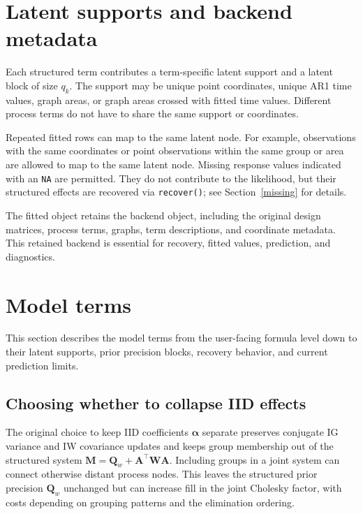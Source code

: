 \documentclass[11pt]{article}
\newcommand{\balpha}{\bm{\alpha}}
\newcommand{\bA}{\bm{A}}
\newcommand{\bM}{\bm{M}}
\newcommand{\bQ}{\bm{Q}}
\newcommand{\bW}{\bm{W}}
\newcommand{\trans}{^\top}
\begin{document}
\section{Latent supports and backend metadata}

Each structured term contributes a term-specific latent support and a latent block of size $q_k$. The support may be unique point coordinates, unique AR1 time values, graph areas, or graph areas crossed with fitted time values. Different process terms do not have to share the same support or coordinates.

Repeated fitted rows can map to the same latent node. For example, observations with the same coordinates or point observations within the same group or area are allowed to map to the same latent node. Missing response values indicated with an \texttt{NA} are permitted. They do not contribute to the likelihood, but their structured effects are recovered via \texttt{recover()}; see Section~\ref{missing} for details.

The fitted object retains the backend object, including the original design matrices, process terms, graphs, term descriptions, and coordinate metadata. This retained backend is essential for recovery, fitted values, prediction, and diagnostics.

\section{Model terms}

This section describes the model terms from the user-facing formula level down to their latent supports, prior precision blocks, recovery behavior, and current prediction limits.

\subsection{Choosing whether to collapse IID effects}
\label{sec:iid-strategy}

The original choice to keep IID coefficients $\balpha$ separate preserves
conjugate IG variance and IW covariance updates and keeps group membership out of
the structured system $\bM=\bQ_w+\bA\trans\bW\bA$. Including groups in a joint
system can connect otherwise distant process nodes. This leaves the structured
prior precision $\bQ_w$ unchanged but can increase fill in the joint Cholesky
factor, with costs depending on grouping patterns and the elimination ordering.
\end{document}
